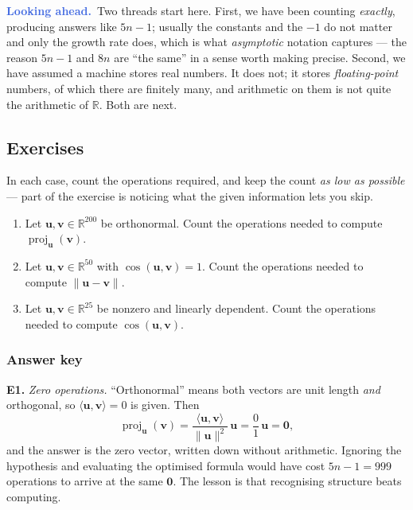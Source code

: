 \documentclass[11pt]{article}
\theoremstyle{plain}
\theoremstyle{definition}
\theoremstyle{remark}
\newcommand{\lookahead}{\par\smallskip\noindent
  \textbf{\sffamily\textcolor{RoyalBlue}{Looking ahead.}}\ \ignorespaces}
\newcommand{\R}{\mathbb{R}}
\newcommand{\vc}[1]{\mathbf{#1}}
\newcommand{\norm}[1]{\lVert #1\rVert}
\newcommand{\proj}[2]{\operatorname{proj}_{#1}(#2)}
\begin{document}
\lookahead Two threads start here. First, we have been counting \emph{exactly},
producing answers like $5n-1$; usually the constants and the $-1$ do not matter
and only the growth rate does, which is what \emph{asymptotic} notation captures
--- the reason $5n-1$ and $8n$ are ``the same'' in a sense worth making precise.
Second, we have assumed a machine stores real numbers. It does not; it stores
\emph{floating-point} numbers, of which there are finitely many, and arithmetic
on them is not quite the arithmetic of $\R$. Both are next.

\subsection{Exercises}
In each case, count the operations required, and keep the count \emph{as low as
possible} --- part of the exercise is noticing what the given information lets
you skip.

\begin{enumerate}[label=\textbf{E\arabic*.},leftmargin=2.8em,itemsep=7pt,
                  topsep=6pt]
  \item Let $\vc{u},\vc{v}\in\R^{200}$ be orthonormal. Count the operations
        needed to compute $\proj{\vc{u}}{\vc{v}}$.
  \item Let $\vc{u},\vc{v}\in\R^{50}$ with $\cos(\vc{u},\vc{v})=1$. Count the
        operations needed to compute $\norm{\vc{u}-\vc{v}}$.
  \item Let $\vc{u},\vc{v}\in\R^{25}$ be nonzero and linearly dependent. Count
        the operations needed to compute $\cos(\vc{u},\vc{v})$.
\end{enumerate}

\subsubsection*{Answer key}

\noindent\textbf{E1.} \emph{Zero operations.} ``Orthonormal'' means both vectors
are unit length \emph{and} orthogonal, so $\langle\vc{u},\vc{v}\rangle=0$ is
given. Then
\[
  \proj{\vc{u}}{\vc{v}}
  = \frac{\langle\vc{u},\vc{v}\rangle}{\norm{\vc{u}}^{2}}\,\vc{u}
  = \frac{0}{1}\,\vc{u} = \vc{0},
\]
and the answer is the zero vector, written down without arithmetic. Ignoring the
hypothesis and evaluating the optimised formula would have cost $5n-1=999$
operations to arrive at the same $\vc{0}$. The lesson is that recognising
structure beats computing.
\end{document}

